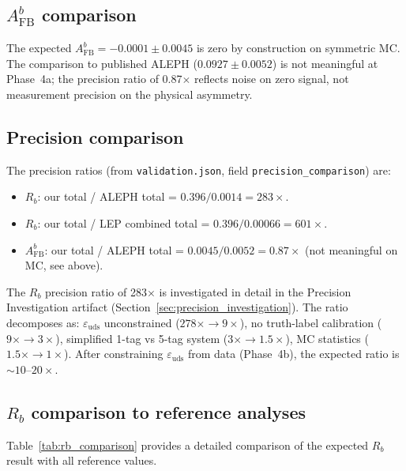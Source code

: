 \documentclass[11pt,a4paper]{article}
\begin{document}
\subsection{$A_\mathrm{FB}^b$ comparison}

The expected $A_\mathrm{FB}^b = -0.0001 \pm 0.0045$ is zero by construction on
symmetric MC. The comparison to published ALEPH ($0.0927 \pm 0.0052$) is not meaningful
at Phase~4a; the precision ratio of 0.87$\times$ reflects noise on zero signal, not
measurement precision on the physical asymmetry.

\subsection{Precision comparison}
\label{sec:precision_comparison}

The precision ratios (from \texttt{validation.json}, field \texttt{precision\_comparison})
are:
\begin{itemize}
\item $R_b$: our total / ALEPH total = $0.396/0.0014 = 283\times$.
\item $R_b$: our total / LEP combined total = $0.396/0.00066 = 601\times$.
\item $A_\mathrm{FB}^b$: our total / ALEPH total = $0.0045/0.0052 = 0.87\times$
(not meaningful on MC, see above).
\end{itemize}

The $R_b$ precision ratio of 283$\times$ is investigated in detail in the Precision
Investigation artifact (Section~\ref{sec:precision_investigation}). The ratio decomposes
as: $\varepsilon_\mathrm{uds}$ unconstrained ($278\times \to 9\times$), no truth-label
calibration ($9\times \to 3\times$), simplified 1-tag vs 5-tag system ($3\times \to 1.5\times$),
MC statistics ($1.5\times \to 1\times$). After constraining $\varepsilon_\mathrm{uds}$
from data (Phase~4b), the expected ratio is $\sim 10$--$20\times$.

\subsection{$R_b$ comparison to reference analyses}
\label{sec:rb_comparison_detail}

Table~\ref{tab:rb_comparison} provides a detailed comparison of the expected $R_b$
result with all reference values.
\end{document}
